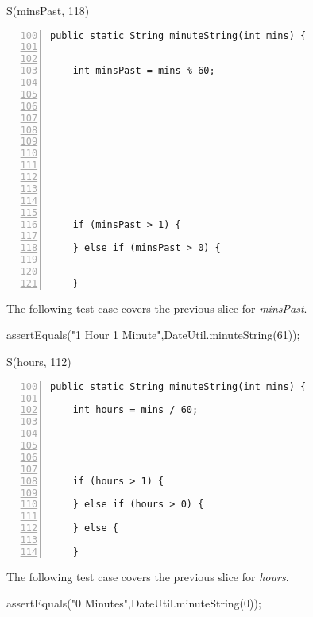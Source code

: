 \documentclass[fontsize=12pt,paper=letter,twoside]{scrartcl}
\begin{document}
S(minsPast, 118)
\begin{lstlisting}[numbers=left,firstnumber=100]
  public static String minuteString(int mins) {
    
    
    int minsPast = mins % 60;
    
    
    
    
    
     
    
     
    
     
    

    if (minsPast > 1) {
      
    } else if (minsPast > 0) {
      
    
    }
\end{lstlisting}
The following test case covers the previous slice for \emph{minsPast}.
\begin{code}
assertEquals("1 Hour 1 Minute",DateUtil.minuteString(61));
\end{code}

S(hours, 112)
\begin{lstlisting}[numbers=left,firstnumber=100]
  public static String minuteString(int mins) {
    
    int hours = mins / 60;
    
    
    
    
    
    if (hours > 1) {
      
    } else if (hours > 0) {
    
    } else {
    
    }
\end{lstlisting}
The following test case covers the previous slice for \emph{hours}.
\begin{code}
assertEquals("0 Minutes",DateUtil.minuteString(0)); 
\end{code}
\end{document}
